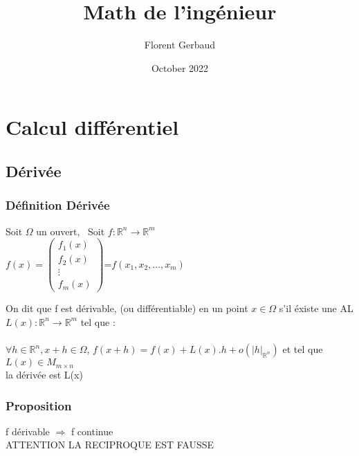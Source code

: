 \documentclass[11pt]{article}
\title{Math de l'ingénieur}
\author{Florent Gerbaud}
\date{October 2022}
\begin{document}
    \maketitle
    \tableofcontents
    \section{Calcul différentiel}
        \subsection{Dérivée}
            \subsubsection{Définition Dérivée}
                \begin{center}
                    Soit $\Omega$ un ouvert, \ 
                    Soit $f: \mathbb{R}^n \longrightarrow \mathbb{R}^m $ \\
                    $f(x)=\begin{pmatrix}
                     f_1(x)\\
                     f_2(x)\\
                    \vdots\\
                     f_m(x)
                    \end{pmatrix}$=$f(x_1,x_2,...,x_m)$
                \end{center}
                On dit que f est dérivable, (ou différentiable) en un point $x\in \Omega$ s'il éxiste une AL $L(x):\mathbb{R}^n \longrightarrow \mathbb{R}^m$ tel que : \\ \\
                $\forall h \in \mathbb{R}^n, x+h \in \Omega$, 
                $f(x+h)=f(x)+L(x).h+o(|h|_{\mathbb{R}^n})$ et tel que $L(x) \in M_{m \times n}$
                \\ la dérivée est L(x)
            \subsubsection{Proposition} 
                \begin{center}
                    
                \end{center}
                f dérivable $\Longrightarrow$ f continue \\
                \color{red} ATTENTION LA RECIPROQUE EST FAUSSE
                \color{black}
\end{document}
